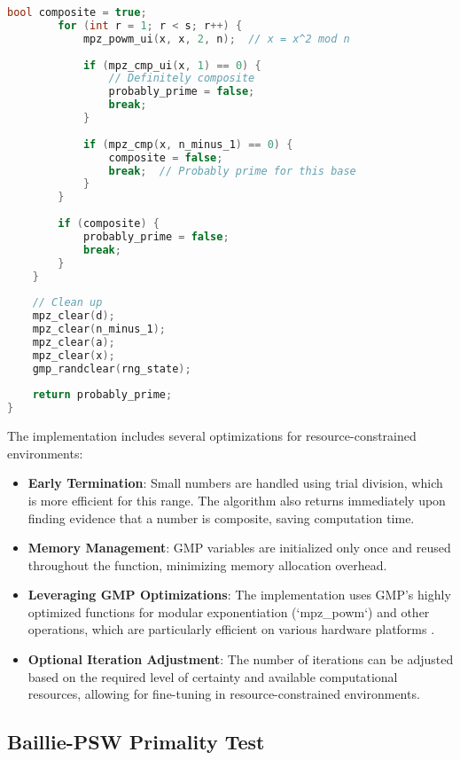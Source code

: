 \begin{lstlisting}[language=C++, caption=Miller-Rabin Primality Test Implementation]
        bool composite = true;
        for (int r = 1; r < s; r++) {
            mpz_powm_ui(x, x, 2, n);  // x = x^2 mod n
            
            if (mpz_cmp_ui(x, 1) == 0) {
                // Definitely composite
                probably_prime = false;
                break;
            }
            
            if (mpz_cmp(x, n_minus_1) == 0) {
                composite = false;
                break;  // Probably prime for this base
            }
        }
        
        if (composite) {
            probably_prime = false;
            break;
        }
    }
    
    // Clean up
    mpz_clear(d);
    mpz_clear(n_minus_1);
    mpz_clear(a);
    mpz_clear(x);
    gmp_randclear(rng_state);
    
    return probably_prime;
}
\end{lstlisting}

The implementation includes several optimizations for resource-constrained environments:

\begin{itemize}
    \item \textbf{Early Termination}: Small numbers are handled using trial division, which is more efficient for this range. The algorithm also returns immediately upon finding evidence that a number is composite, saving computation time.
    
    \item \textbf{Memory Management}: GMP variables are initialized only once and reused throughout the function, minimizing memory allocation overhead.
    
    \item \textbf{Leveraging GMP Optimizations}: The implementation uses GMP's highly optimized functions for modular exponentiation (`mpz_powm`) and other operations, which are particularly efficient on various hardware platforms \cite{granlund2012}.
    
    \item \textbf{Optional Iteration Adjustment}: The number of iterations can be adjusted based on the required level of certainty and available computational resources, allowing for fine-tuning in resource-constrained environments.
\end{itemize}

\subsection{Baillie-PSW Primality Test}

